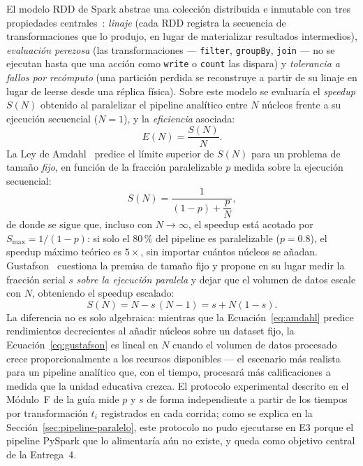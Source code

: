 \documentclass[12pt,a4paper]{article}
\begin{document}
El modelo RDD de Spark abstrae una colección distribuida e inmutable con
tres propiedades centrales~\cite{zaharia2012rdd}: \emph{linaje} (cada RDD
registra la secuencia de transformaciones que lo produjo, en lugar de
materializar resultados intermedios), \emph{evaluación perezosa} (las
transformaciones --- \texttt{filter}, \texttt{groupBy}, \texttt{join} ---
no se ejecutan hasta que una acción como \texttt{write} o \texttt{count} las
dispara) y \emph{tolerancia a fallos por recómputo} (una partición perdida
se reconstruye a partir de su linaje en lugar de leerse desde una réplica
física). Sobre este modelo se evaluaría el \emph{speedup} $S(N)$ obtenido al
paralelizar el pipeline analítico entre $N$ núcleos frente a su ejecución
secuencial ($N=1$), y la \emph{eficiencia} asociada:
\begin{equation}
  E(N) = \frac{S(N)}{N}.
  \label{eq:eficiencia}
\end{equation}
La Ley de Amdahl~\cite{amdahl1967validity} predice el límite superior de
$S(N)$ para un problema de tamaño \emph{fijo}, en función de la fracción
paralelizable $p$ medida sobre la ejecución secuencial:
\begin{equation}
  S(N) = \frac{1}{(1-p) + \dfrac{p}{N}},
  \label{eq:amdahl}
\end{equation}
de donde se sigue que, incluso con $N \to \infty$, el speedup está acotado
por $S_{\max} = 1/(1-p)$: si solo el 80\,\% del pipeline es paralelizable
($p=0.8$), el speedup máximo teórico es $5\times$, sin importar cuántos
núcleos se añadan. Gustafson~\cite{gustafson1988reevaluating} cuestiona la
premisa de tamaño fijo y propone en su lugar medir la fracción serial $s$
\emph{sobre la ejecución paralela} y dejar que el volumen de datos escale
con $N$, obteniendo el speedup escalado:
\begin{equation}
  S(N) = N - s\,(N-1) = s + N(1-s).
  \label{eq:gustafson}
\end{equation}
La diferencia no es solo algebraica: mientras que la Ecuación~\eqref{eq:amdahl}
predice rendimientos decrecientes al añadir núcleos sobre un dataset fijo,
la Ecuación~\eqref{eq:gustafson} es lineal en $N$ cuando el volumen de datos
procesado crece proporcionalmente a los recursos disponibles --- el
escenario más realista para un pipeline analítico que, con el tiempo,
procesará más calificaciones a medida que la unidad educativa crezca. El
protocolo experimental descrito en el Módulo~F de la guía mide $p$ y $s$
de forma independiente a partir de los tiempos por transformación $t_i$
registrados en cada corrida; como se explica en la
Sección~\ref{sec:pipeline-paralelo}, este protocolo no pudo ejecutarse en
E3 porque el pipeline PySpark que lo alimentaría aún no existe, y queda
como objetivo central de la Entrega~4.
\end{document}
